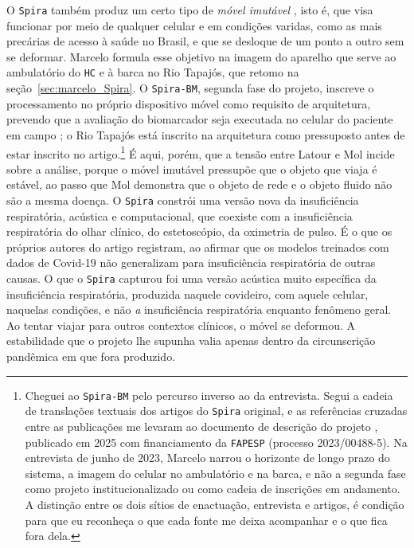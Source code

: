 O \texttt{Spira} também produz um certo tipo de \textit{móvel imutável} \parencite{Latour2017Esperanca}, isto é, que visa funcionar por meio de qualquer celular e em condições varidas, como as mais precárias de acesso à saúde no Brasil, e que se desloque de um ponto a outro sem se deformar. Marcelo formula esse objetivo na imagem do aparelho que serve ao ambulatório do \texttt{HC} e à barca no Rio Tapajós, que retomo na seção~\ref{sec:marcelo_Spira}. O \texttt{Spira-BM}, segunda fase do projeto, inscreve o processamento no próprio dispositivo móvel como requisito de arquitetura, prevendo que a avaliação do biomarcador seja executada no celular do paciente em campo \parencite{Finger2025SPIRABM}; o Rio Tapajós está inscrito na arquitetura como pressuposto antes de estar inscrito no artigo.\footnote{Cheguei ao \texttt{Spira-BM} pelo percurso inverso ao da entrevista. Segui a cadeia de translações textuais dos artigos do \texttt{Spira} original, e as referências cruzadas entre as publicações me levaram ao documento de descrição do projeto \parencite{Finger2025SPIRABM}, publicado em 2025 com financiamento da \texttt{FAPESP} (processo 2023/00488-5). Na entrevista de junho de 2023, Marcelo narrou o horizonte de longo prazo do sistema, a imagem do celular no ambulatório e na barca, e não a segunda fase como projeto institucionalizado ou como cadeia de inscrições em andamento. A distinção entre os dois sítios de enactuação, entrevista e artigos, é condição para que eu reconheça o que cada fonte me deixa acompanhar e o que fica fora dela.} É aqui, porém, que a tensão entre Latour e Mol incide sobre a análise, porque o móvel imutável pressupõe que o objeto que viaja é estável, ao passo que Mol demonstra que o objeto de rede e o objeto fluido não são a mesma doença. O \texttt{Spira} constrói uma versão nova da insuficiência respiratória, acústica e computacional, que coexiste com a insuficiência respiratória do olhar clínico, do estetoscópio, da oximetria de pulso. É o que os próprios autores do artigo registram, ao afirmar que os modelos treinados com dados de Covid-19 não generalizam para insuficiência respiratória de outras causas. O que o \texttt{Spira} capturou foi uma versão acústica muito específica da insuficiência respiratória, produzida naquele covideiro, com aquele celular, naquelas condições, e não \textit{a} insuficiência respiratória enquanto fenômeno geral. Ao tentar viajar para outros contextos clínicos, o móvel se deformou. A estabilidade que o projeto lhe supunha valia apenas dentro da circunscrição pandêmica em que fora produzido.
